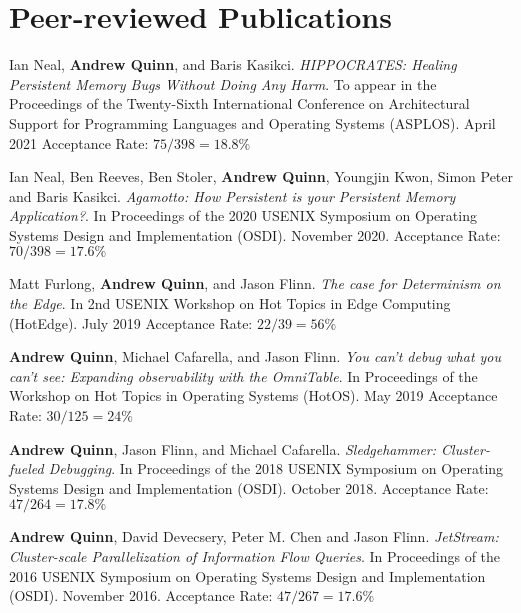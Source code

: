 \documentclass[letterpaper,10pt]{article}
\newcommand{\paper}[3]{#1. #2 #3}
\begin{document}
\section{Peer-reviewed Publications}
\begin{smenumerate}
  \item \paper{Ian Neal, \textbf{Andrew Quinn}, and Baris
    Kasikci}{\emph{HIPPOCRATES: Healing Persistent Memory Bugs Without Doing Any
      Harm}. To appear in the Proceedings of the Twenty-Sixth International
    Conference on Architectural Support for Programming Languages and Operating
    Systems (ASPLOS). April 2021}{Acceptance Rate: $75/398=18.8\%$}
    
\item \paper{Ian Neal, Ben Reeves, Ben Stoler, \textbf{Andrew Quinn}, Youngjin Kwon,
  Simon Peter and Baris Kasikci}{\emph{Agamotto: How Persistent is your
    Persistent Memory Application?}.  In Proceedings of the 2020 USENIX
  Symposium on Operating Systems Design and Implementation (OSDI).  November
  2020.}{Acceptance Rate: $70/398=17.6\%$}

\item \paper{Matt Furlong, \textbf{Andrew Quinn}, and Jason Flinn}
      {\emph{The case for Determinism on the Edge}.  In 2nd USENIX
        Workshop on Hot Topics in Edge Computing (HotEdge).  July
        2019}{Acceptance Rate: $22/39=56\%$}

\item \paper{\textbf{Andrew Quinn}, Michael Cafarella, and Jason
  Flinn}{\emph{You can't debug what you can't see: Expanding
    observability with the OmniTable}. In Proceedings of the Workshop
  on Hot Topics in Operating Systems (HotOS).  May 2019}{Acceptance
  Rate: $30/125=24\%$}

\item \paper{\textbf{Andrew Quinn}, Jason Flinn, and Michael Cafarella}{
  \emph{Sledgehammer: Cluster-fueled Debugging}.  In Proceedings of the 2018
  USENIX Symposium on Operating Systems Design and Implementation (OSDI).
  October 2018.}{Acceptance Rate: $47/264 = 17.8\%$}

\item \paper{\textbf{Andrew Quinn}, David Devecsery, Peter M. Chen and Jason
  Flinn}{\emph{JetStream: Cluster-scale Parallelization of Information
  Flow Queries}.  In Proceedings of the 2016 USENIX Symposium on
    Operating Systems Design and Implementation (OSDI). November
  2016.}{Acceptance Rate: $47/267=17.6\%$}
\end{smenumerate}
\end{document}

